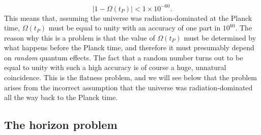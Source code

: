 \documentclass[11pt, a4paper,oneside,openright]{book}
\numberwithin{equation}{section}
\begin{document}
\begin{equation} \label{eq:flatness_plancktime}
|1-\Omega(t_P)|<1\times10^{-60}.
\end{equation}
This means that, assuming the universe was radiation-dominated at the Planck time, $\Omega(t_P)$ must be equal to unity with an accuracy of one part in $10^{60}$. The reason why this is a problem is that the value of $\Omega(t_P)$ must be determined by what happens before the Planck time, and therefore it must presumably depend on {\it random} quantum effects. The fact that a random number turns out to be equal to unity with such a high accuracy is of course a huge, unnatural coincidence. This is the flatness problem, and we will see below that the problem arises from the incorrect assumption that the universe was radiation-dominated all the way back to the Planck time.

\subsection{The horizon problem}
\end{document}

